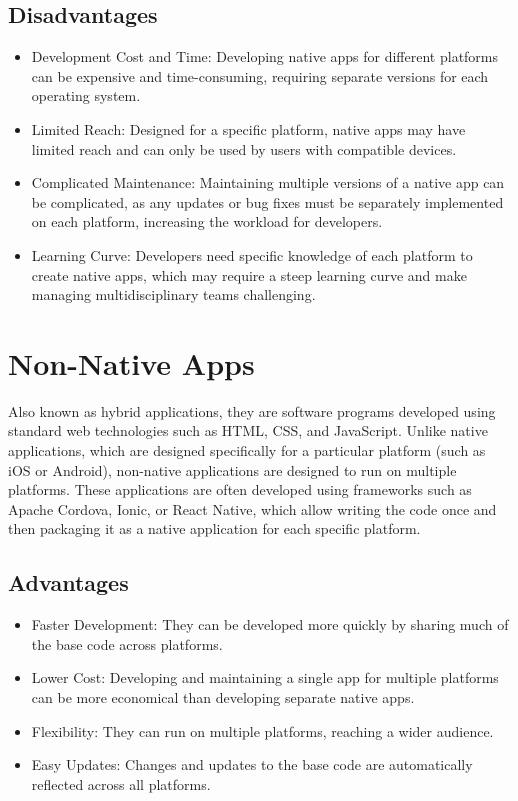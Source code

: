\documentclass{article}
\begin{document}
\begin{multicols}{2}
		\subsection{Disadvantages }
		
		\begin{itemize}
			\item Development Cost and Time: Developing native apps for different platforms can be expensive and time-consuming, requiring separate versions for each operating system.
			\item Limited Reach: Designed for a specific platform, native apps may have limited reach and can only be used by users with compatible devices.
			\item Complicated Maintenance: Maintaining multiple versions of a native app can be complicated, as any updates or bug fixes must be separately implemented on each platform, increasing the workload for developers.
			\item Learning Curve: Developers need specific knowledge of each platform to create native apps, which may require a steep learning curve and make managing multidisciplinary teams challenging.
			
		\end{itemize}
		
		\section{Non-Native Apps}
		Also known as hybrid applications, they are software programs developed using standard web technologies such as HTML, CSS, and JavaScript. Unlike native applications, which are designed specifically for a particular platform (such as iOS or Android), non-native applications are designed to run on multiple platforms. These applications are often developed using frameworks such as Apache Cordova, Ionic, or React Native, which allow writing the code once and then packaging it as a native application for each specific platform.
		\subsection{Advantages }
		
		\begin{itemize}
			\item Faster Development: They can be developed more quickly by sharing much of the base code across platforms.
			\item Lower Cost: Developing and maintaining a single app for multiple platforms can be more economical than developing separate native apps.
			\item Flexibility: They can run on multiple platforms, reaching a wider audience.
			\item Easy Updates: Changes and updates to the base code are automatically reflected across all platforms.
		\end{itemize}
		

\end{multicols}
\end{document}
